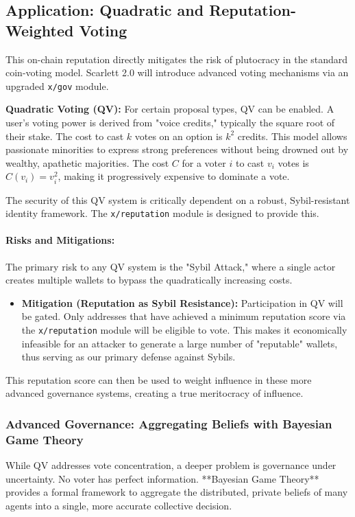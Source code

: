 \documentclass[10pt]{article}
\begin{document}
\subsection{Application: Quadratic and Reputation-Weighted Voting}
This on-chain reputation directly mitigates the risk of plutocracy in the standard coin-voting model. Scarlett 2.0 will introduce advanced voting mechanisms via an upgraded \texttt{x/gov} module.

\textbf{Quadratic Voting (QV):} For certain proposal types, QV can be enabled. A user's voting power is derived from "voice credits," typically the square root of their stake. The cost to cast \(k\) votes on an option is \(k^2\) credits. This model allows passionate minorities to express strong preferences without being drowned out by wealthy, apathetic majorities. The cost \(C\) for a voter \(i\) to cast \(v_i\) votes is \(C(v_i) = v_i^2\), making it progressively expensive to dominate a vote.

The security of this QV system is critically dependent on a robust, Sybil-resistant identity framework. The \texttt{x/reputation} module is designed to provide this.

\paragraph{Risks and Mitigations:} The primary risk to any QV system is the "Sybil Attack," where a single actor creates multiple wallets to bypass the quadratically increasing costs.
\begin{itemize}[leftmargin=*, itemsep=2pt]
    \item \textbf{Mitigation (Reputation as Sybil Resistance):} Participation in QV will be gated. Only addresses that have achieved a minimum reputation score via the \texttt{x/reputation} module will be eligible to vote. This makes it economically infeasible for an attacker to generate a large number of "reputable" wallets, thus serving as our primary defense against Sybils.
\end{itemize}

This reputation score can then be used to weight influence in these more advanced governance systems, creating a true meritocracy of influence.

\subsubsection{Advanced Governance: Aggregating Beliefs with Bayesian Game Theory}
While QV addresses vote concentration, a deeper problem is governance under uncertainty. No voter has perfect information. **Bayesian Game Theory** provides a formal framework to aggregate the distributed, private beliefs of many agents into a single, more accurate collective decision.
\end{document}
